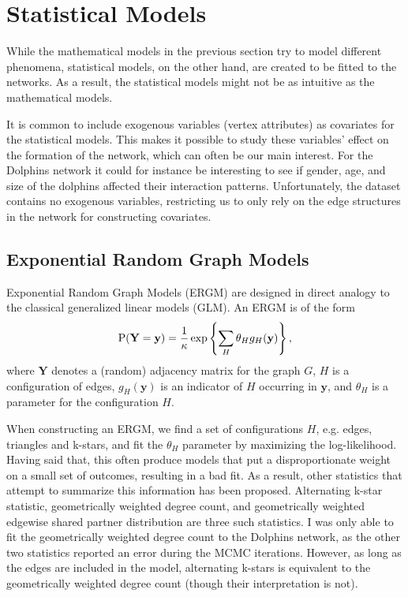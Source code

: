 \documentclass[11pt,a4paper]{article}
\begin{document}
\section{Statistical Models}
While the mathematical models in the previous section try to model different phenomena, statistical models, on the other hand, are created to be fitted to the networks. As a result, the statistical models might not be as intuitive as the mathematical models.

It is common to include exogenous variables (vertex attributes) as covariates for the statistical models. This makes it possible to study these variables' effect on the formation of the network, which can  often be our main interest.
For the Dolphins network it could for instance be interesting to see if gender, age, and size of the dolphins affected their interaction patterns. 
Unfortunately, the dataset contains no exogenous variables, restricting us to only rely on the edge structures in the network for constructing covariates.

\subsection{Exponential Random Graph Models}

Exponential Random Graph Models (ERGM) are designed in direct analogy to the classical generalized linear models (GLM). 
An ERGM is of the form
\begin{align}
    \text P(\mathbf{Y} = \mathbf{y}) = \frac{1}{\kappa} \exp \left\{\sum_H \theta_H g_H(\mathbf{y})\right\},
\end{align}
where $\mathbf{Y}$ denotes a (random) adjacency matrix for the graph $G$, $H$ is a configuration of edges, $g_H(\mathbf y)$ is an indicator of $H$ occurring in  $\mathbf y$, and $\theta_H$ is a parameter for the configuration $H$.

When constructing an ERGM, we find a set of configurations $H$, e.g. edges, triangles and k-stars, and fit the $\theta_H$ parameter by maximizing the log-likelihood.
Having said that, this often produce models that put a disproportionate weight on a small set of outcomes, resulting in a bad fit. As a result, other statistics that attempt to summarize this information has been proposed. Alternating k-star statistic, geometrically weighted degree count, and geometrically weighted edgewise shared partner distribution are three such statistics. 
I was only able to fit the geometrically weighted degree count to the Dolphins network, as the other two statistics reported an error during the MCMC iterations.
However, as long as the edges are included in the model, alternating k-stars is equivalent to the geometrically weighted degree count (though their interpretation is not).
\end{document}

